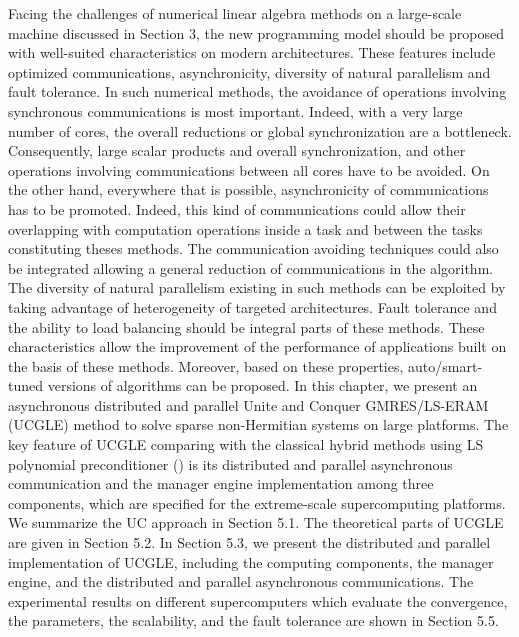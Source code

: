 \begin{displayquote}
	
	\textsf{Facing the challenges of numerical linear algebra methods on a large-scale machine discussed in Section 3, the new programming model should be proposed with well-suited characteristics on modern architectures. These features include optimized communications, asynchronicity, diversity of natural parallelism and fault tolerance. In such numerical methods, the avoidance of operations involving synchronous communications is most important. Indeed, with a very large number of cores, the overall reductions or global synchronization are a bottleneck. Consequently, large scalar products and overall synchronization, and other operations involving communications between all cores have to be avoided. On the other hand, everywhere that is possible, asynchronicity of communications has to be promoted. Indeed, this kind of communications could allow their overlapping with computation operations inside a task and between the tasks constituting theses methods. The communication avoiding techniques could also be integrated allowing a general reduction of communications in the algorithm. The diversity of natural parallelism existing in such methods can be exploited by taking advantage of heterogeneity of targeted architectures. Fault tolerance and the ability to load balancing should be integral parts of these methods. These characteristics allow the improvement of the performance of applications built on the basis of these methods. Moreover, based on these properties, auto/smart-tuned versions of algorithms can be proposed. In this chapter, we present an asynchronous distributed and parallel Unite and Conquer GMRES/LS-ERAM (UCGLE) method to solve sparse non-Hermitian systems on large platforms. The key feature of UCGLE comparing with the classical hybrid methods using LS polynomial preconditioner (\cite{essai1999heterogeneous,he2006hybrid}) is its distributed and parallel asynchronous communication and the manager engine implementation among three components, which are specified for the extreme-scale supercomputing platforms. We summarize the UC approach in Section 5.1. The theoretical parts of UCGLE are given in Section 5.2. In Section 5.3, we present the distributed and parallel implementation of UCGLE, including the computing components, the manager engine, and the distributed and parallel asynchronous communications. The experimental results on different supercomputers which evaluate the convergence, the parameters, the scalability, and the fault tolerance are shown in Section 5.5.}
\end{displayquote}

